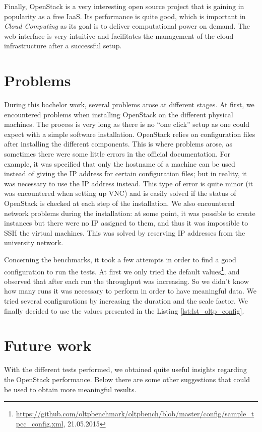Finally, OpenStack is a very interesting open source project that is gaining in popularity as a free IaaS.
Its performance is quite good, which is important in \textit{Cloud Computing} as its goal is to deliver computational power on demand.
The web interface is very intuitive and facilitates the management of the cloud infrastructure after a successful setup.







\section{Problems}
During this bachelor work, several problems arose at different stages. 
At first, we encountered problems when installing OpenStack on the different physical machines.
The process is very long as there is no ``one click'' setup as one could expect with a simple software installation.
OpenStack relies on configuration files after installing the different components.
This is where problems arose, as sometimes there were some little errors in the official documentation.
For example, it was specified that only the hostname of a machine can be used instead of giving the IP address for certain configuration files; but in reality, it was necessary to use the IP address instead. 
This type of error is quite minor (it was encountered when setting up VNC) and is easily solved if the status of OpenStack is checked at each step of the installation.
We also encountered network problems during the installation: at some point, it was possible to create instances but there were no IP assigned to them, and thus it was impossible to SSH the virtual machines.
This was solved by reserving IP addresses from the university network.

Concerning the benchmarks, it took a few attempts in order to find a good configuration to run the tests.
At first we only tried the default values\footnote{\url{https://github.com/oltpbenchmark/oltpbench/blob/master/config/sample_tpcc_config.xml}, 21.05.2015}, and observed that after each run the throughput was increasing.
So we didn't know how many runs it was necessary to perform in order to have meaningful data.
We tried several configurations by increasing the duration and the scale factor.
We finally decided to use the values presented in the Listing \ref{lst:lst_oltp_config}.


\section{Future work}
With the different tests performed, we obtained quite useful insights regarding the OpenStack performance.
Below there are some other suggestions that could be used to obtain more meaningful results.

